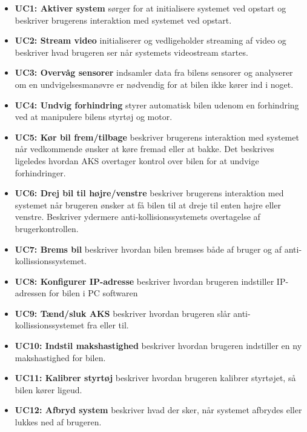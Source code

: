 \begin{itemize}

\item \textbf{UC1: Aktiver system} sørger for at initialisere systemet ved opstart og beskriver brugerens interaktion med systemet ved opstart.

\item \textbf{UC2: Stream video} initialiserer og vedligeholder streaming af video og beskriver hvad brugeren ser når systemets videostream startes.

\item \textbf{UC3: Overvåg sensorer} indsamler data fra bilens sensorer og analyserer om en undvigelsesmanøvre er nødvendig for at bilen ikke kører ind i noget.

\item \textbf{UC4: Undvig forhindring} styrer automatisk bilen udenom en forhindring ved at manipulere bilens styrtøj og motor.

\item \textbf{UC5: Kør bil frem/tilbage} beskriver brugerens interaktion med systemet når vedkommende ønsker at køre fremad eller at bakke. 
Det beskrives ligeledes hvordan AKS overtager kontrol over bilen for at undvige forhindringer.

\item \textbf{UC6: Drej bil til højre/venstre} beskriver brugerens interaktion med systemet når brugeren ønsker at få bilen til at dreje til enten højre eller venstre. Beskriver ydermere anti-kollisionssystemets overtagelse af brugerkontrollen.

\item \textbf{UC7: Brems bil} beskriver hvordan bilen bremses både af bruger og af anti-kollissionssystemet.

\item \textbf{UC8: Konfigurer IP-adresse} beskriver hvordan brugeren indstiller IP-adressen for bilen i PC softwaren

\item \textbf{UC9: Tænd/sluk AKS} beskriver hvordan brugeren slår anti-kollissionssystemet fra eller til.

\item \textbf{UC10: Indstil makshastighed} beskriver hvordan brugeren indstiller en ny makshastighed for bilen.

\item \textbf{UC11: Kalibrer styrtøj} beskriver hvordan brugeren kalibrer styrtøjet, så bilen kører ligeud.

\item \textbf{UC12: Afbryd system} beskriver hvad der sker, når systemet afbrydes eller lukkes ned af brugeren.

\end{itemize}

